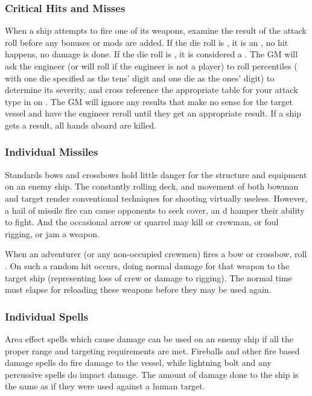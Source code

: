 \begin{multicols*}{2}
\subsubsection{Critical Hits and Misses}
When a ship attempts to fire one of its weapons, examine the result of the attack roll before any bonuses or mods are added. If the die roll is , it is an , no hit happens, no damage is done. If the die roll is , it is considered a . The GM will ask the engineer (or will roll if the engineer is not a player) to roll percentiles ( with one die specified as the tens' digit and one die as the ones' digit) to determine its severity, and cross reference the appropriate table for your attack type in  on . The GM  will ignore any results that make no sense for the target vessel and have the engineer reroll until they get an appropriate result. If a ship gets a  result, all hands aboard are killed.
\subsubsection{Individual Missiles}
Standards bows and crossbows hold little danger
for the structure and equipment on an enemy ship. The constantly rolling deck, and movement of both bowman and target render conventional techniques for shooting virtually useless. However, a hail of missile fire can cause opponents to seek cover, an d hamper their ability to fight. And the occasional arrow or quarrel may kill or crewman, or foul rigging, or jam a weapon.

When an adventurer (or any non-occupied crewmen) fires a bow or crossbow, roll . On  such a random hit occurs, doing normal damage for that weapon to the target ship (representing loss of crew or damage to rigging). The normal time must elapse for reloading these weapons before they may be used again.
\subsubsection{Individual Spells}
Area effect spells which cause damage can be used on an enemy ship if all the proper range and targeting requirements are met. Fireballs and other fire based damage spells do fire damage to the vessel, while lightning bolt and any percussive spells do impact damage. The amount of damage done to the ship is the same as if they were used against a human target.

\end{multicols*}
